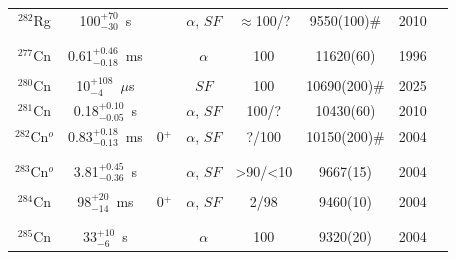 \begin{center}
\begin{longtable}{c|ccccccl}
$^{282}$Rg	& 100$^{+70}_{-30}$~s& 		&$\alpha$, $SF$		&$\approx$100/?&9550(100)$\#$	&2010	&{\tiny\cite{Oganessian2010,Oganessian2011,Oganessian2011a,Oganessian2012a,Oganessian2013b,Khuyagbaatar2014}}\\
			&				&			&					&			& 				    &		&{\tiny\cite{Oganessian2015,Oganessian2017,Khuyagbaatar2019}}\\
\hline\\
$^{277}$Cn	& 0.61$^{+0.46}_{-0.18}$~ms&&$\alpha$			&100		&11620(60)		    &1996	&{\tiny\cite{Hofmann1996,Hofmann1998,Hofmann2000,Hofmann2002,Karol2003,Morita2007}}\\
			&				&			&					&			& 				    &		&{\tiny\cite{Sumita2013,Morita2015,Muenzenberg2015}}\\
$^{280}$Cn	& 10$^{+108}_{-4}$~$\mu$s   &  &$SF$		    &100		&10690(200)$\#$	    &2025	&{\tiny\cite{Oganessian2025}}\\
$^{281}$Cn	& 0.18$^{+0.10}_{-0.05}$~s &&$\alpha$, $SF$		&100/?		&10430(60)		    &2010	&{\tiny\cite{Ellison2010,Utyonkov2015,Utyonkov2018}}\\
$^{282}$Cn$^o$	& 0.83$^{+0.18}_{-0.13}$~ms&0$^+$&$\alpha$, $SF$&?/100	&10150(200)$\#$	    &2004	&{\tiny\cite{Oganessian2004,Oganessian2004a,Oganessian2005a,Oganessian2006,Stavsetra2009,Ellison2010}}\\
			&				&			&					&			& 				    &		&{\tiny\cite{Oganessian2011a,Oganessian2012a,Oganessian2015,Oganessian2017,Samark-Roth2021,Samark-Roth2023}}\\
			&				&			&					&			& 				    &		&{\tiny\cite{Oganessian2022b,Gates2024}}\\
$^{283}$Cn$^o$	& 3.81$^{+0.45}_{-0.36}$~s&	&$\alpha$, $SF$	&>90/<10&9667(15)		        &2004	&{\tiny\cite{Oganessian2004,Oganessian2004a,Gregorich2005,Oganessian2006,Stavsetra2009,Oganessian2011a}}\\
			&				&			&					&			& 				    &		&{\tiny\cite{Oganessian2015,Oganessian2017,Khuyagbaatar2019,Oganessian2022b}}\\
$^{284}$Cn	& 98$^{+20}_{-14}$~ms&0$^+$&$\alpha$, $SF$		&2/98		&9460(10)     	    &2004	&{\tiny\cite{Oganessian2004,Oganessian2004a,Duellmann2010,Eichler2010,Gates2011,Oganessian2011a}}\\
			&				&			&					&			& 				    &		&{\tiny\cite{Hofmann2012,Morita2014,Yakushev2014,Oganessian2015,Kaji2017,Oganessian2017}}\\
			&				&			&					&			& 				    &		&{\tiny\cite{Samark-Roth2021}}\\
$^{285}$Cn	& 33$^{+10}_{-6}$~s&		&$\alpha$			&100		&9320(20)    	    &2004	&{\tiny\cite{Oganessian2004,Oganessian2004a,Oganessian2004c,Oganessian2004d,Oganessian2011a,Oganessian2015}}\\

\end{longtable}
\end{center}
